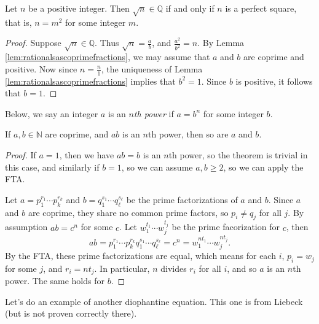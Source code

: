 \documentclass[11pt,dvipsnames]{book}
\numberwithin{figure}{section} %
\numberwithin{table}{section} %
\begin{document}
\begin{theorem}
\label{t:perfectsquare}
 Let $n$ be a positive integer.  Then $\sqrt{n}\in\mathbb{Q}$ if and only if $n$ is a perfect square, that is, $n=m^2$ for some integer $m$.
 \end{theorem}

\begin{proof}
Suppose $\sqrt{n}\in\mathbb{Q}$.
Thus $\sqrt{n} = \frac{a}{b}$, and $\frac{a^2}{b^2} = n$.
By Lemma \ref{lem:rationalsascoprimefractions}, we may assume that $a$ and $b$ are coprime and positive.
Now since $n = \frac{n}{1}$, the uniqueness of Lemma \ref{lem:rationalsascoprimefractions} implies that $b^2=1$.
Since $b$ is positive, it follows that $b = 1$.
\end{proof}

Below, we say an integer $a$ is an {\it $n$th power} if $a=b^n$ for some integer $b$.

\begin{theorem}
\label{t:abn}
If $a,b\in\mathbb{N}$ are coprime, and $ab$ is an $n$th power, then so are $a$ and $b$.
\end{theorem}

\begin{proof}
 If $a=1$, then we have $ab=b$ is an $n$th power, so the theorem is trivial in this case, and similarly if $b=1$, so we can assume $a,b \geq  2$, so we can apply the FTA.

Let $a=p_{1}^{r_{1}}\cdots p_{k}^{r_{k}}$ and $b=q_{1}^{s_{1}}\cdots q_{\ell}^{s_{\ell}}$ be the prime factorizations of $a$ and $b$. Since $a$ and $b$ are coprime, they share no common prime factors, so $p_{i}\neq q_{j}$ for all $j$.  By assumption $ab=c^n$ for some $c$. Let $w_{1}^{t_{1}}\cdots w_{j}^{t_{j}}$ be the prime facorization for $c$, then
\[
ab = p_{1}^{r_{1}}\cdots p_{k}^{r_{k}}q_{1}^{s_{1}}\cdots q_{\ell}^{s_{\ell}}
=c^n=w_{1}^{nt_{1}}\cdots w_{j}^{nt_{j}}.
\]
By the FTA,  these prime factorizations are equal, which means for each $i$,  $p_{i}=w_{j}$ for some $j$, and $r_{i}=nt_{j}$. In particular, $n$ divides $r_{i}$ for all $i$, and so $a$ is an $n$th power. The same holds for $b$.
\end{proof}

Let's do an example of another diophantine equation. This one is from Liebeck (but is not proven correctly there).
\end{document}
